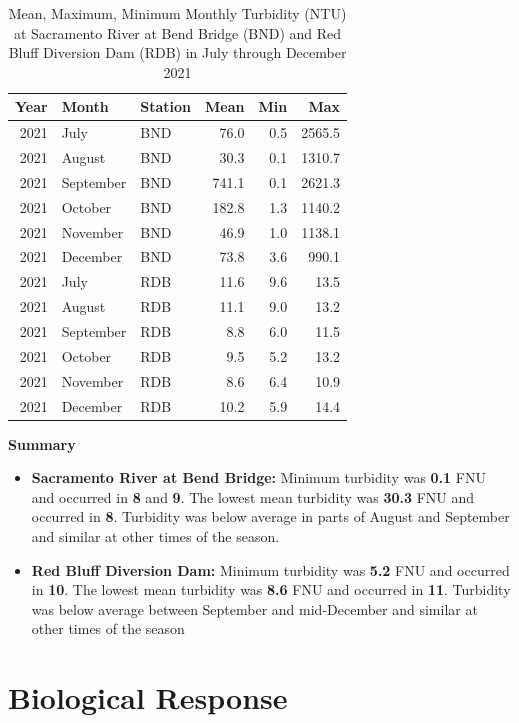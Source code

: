 \documentclass[
]{book}
\providecommand{\tightlist}{%
  \setlength{\itemsep}{0pt}\setlength{\parskip}{0pt}}
\theoremstyle{definition}
\theoremstyle{definition}
\theoremstyle{definition}
\theoremstyle{definition}
\theoremstyle{remark}
\begin{document}
\begin{table}
\centering
\caption{Mean, Maximum, Minimum Monthly Turbidity (NTU) at Sacramento River at Bend Bridge (BND) and Red Bluff Diversion Dam (RDB) in July through December 2021}
\centering
\begin{tabular}[t]{rllrrr}
\hline
Year & Month & Station & Mean & Min & Max\\
\hline
2021 & July & BND & 76.0 & 0.5 & 2565.5\\
\hline
2021 & August & BND & 30.3 & 0.1 & 1310.7\\
\hline
2021 & September & BND & 741.1 & 0.1 & 2621.3\\
\hline
2021 & October & BND & 182.8 & 1.3 & 1140.2\\
\hline
2021 & November & BND & 46.9 & 1.0 & 1138.1\\
\hline
2021 & December & BND & 73.8 & 3.6 & 990.1\\
\hline
2021 & July & RDB & 11.6 & 9.6 & 13.5\\
\hline
2021 & August & RDB & 11.1 & 9.0 & 13.2\\
\hline
2021 & September & RDB & 8.8 & 6.0 & 11.5\\
\hline
2021 & October & RDB & 9.5 & 5.2 & 13.2\\
\hline
2021 & November & RDB & 8.6 & 6.4 & 10.9\\
\hline
2021 & December & RDB & 10.2 & 5.9 & 14.4\\
\hline
\end{tabular}
\end{table}

\textbf{Summary}

\begin{itemize}
\tightlist
\item
  \textbf{Sacramento River at Bend Bridge:} Minimum turbidity was \textbf{0.1} FNU and occurred in \textbf{8} and \textbf{9}. The lowest mean turbidity was \textbf{30.3} FNU and occurred in \textbf{8}. Turbidity was below average in parts of August and September and similar at other times of the season.
\item
  \textbf{Red Bluff Diversion Dam:} Minimum turbidity was \textbf{5.2} FNU and occurred in \textbf{10}. The lowest mean turbidity was \textbf{8.6} FNU and occurred in \textbf{11}. Turbidity was below average between September and mid-December and similar at other times of the season
\end{itemize}

\hypertarget{biological-response-2}{%
\section{Biological Response}\label{biological-response-2}}
\end{document}
